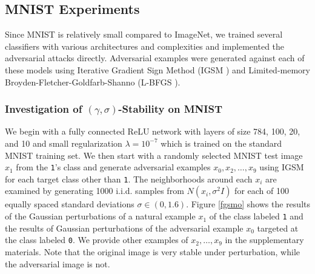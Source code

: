 \subsection{MNIST Experiments}

Since MNIST is relatively small compared to ImageNet, we trained several classifiers with various architectures and complexities and implemented the adversarial attacks directly. Adversarial examples were generated against each of these models using Iterative Gradient Sign Method (IGSM \citep{kurakin_adversarial_2016}) and Limited-memory Broyden-Fletcher-Goldfarb-Shanno (L-BFGS \citep{liu1989limited}).

\subsubsection{Investigation of $(\gamma, \sigma)$-Stability on MNIST}\label{sec:mnist}

We begin with a fully connected ReLU network with layers of size 784, 100, 20, and 10 and small regularization $\lambda = 10^{-7}$ which is trained on the standard MNIST training set. We then start with a randomly selected MNIST test image $x_1$ from the \texttt{1}'s class and generate adversarial examples $x_0,x_2,\dots,x_9$ using IGSM for each target class other than \texttt{1}. The neighborhoods around each $x_i$ are examined by generating 1000 i.i.d. samples from $N(x_i,\sigma^2I)$ for each of 100 equally spaced standard deviations $\sigma\in(0,1.6)$. Figure \ref{fgsmo} shows the results of the Gaussian perturbations of a natural example $x_1$ of the class labeled \texttt{1} and the results of Gaussian perturbations of the adversarial example $x_0$ targeted at the class labeled \texttt{0}. We provide other examples of $x_2,\ldots,x_9$ in the supplementary materials. Note that the original image is very stable under perturbation, while the adversarial image is not. 

